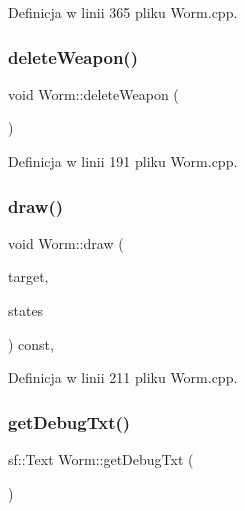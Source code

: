 Definicja w linii 365 pliku Worm.\+cpp.

\mbox{\label{class_worm_adbede9b2b03f764f71629a299aec5299}} 
\subsubsection{\texorpdfstring{delete\+Weapon()}{deleteWeapon()}}
{\footnotesize\ttfamily void Worm\+::delete\+Weapon (\begin{DoxyParamCaption}{ }\end{DoxyParamCaption})}



Definicja w linii 191 pliku Worm.\+cpp.

\mbox{\label{class_worm_adc9fd6dc3b770d4feada327666f31ee3}} 
\subsubsection{\texorpdfstring{draw()}{draw()}}
{\footnotesize\ttfamily void Worm\+::draw (\begin{DoxyParamCaption}\item[{sf\+::\+Render\+Target \&}]{target,  }\item[{sf\+::\+Render\+States}]{states }\end{DoxyParamCaption}) const\hspace{0.3cm}{\ttfamily [override]}, {\ttfamily [protected]}}



Definicja w linii 211 pliku Worm.\+cpp.

\mbox{\label{class_worm_afed2a8beb878659d49977440293ef884}} 
\subsubsection{\texorpdfstring{get\+Debug\+Txt()}{getDebugTxt()}}
{\footnotesize\ttfamily sf\+::\+Text Worm\+::get\+Debug\+Txt (\begin{DoxyParamCaption}{ }\end{DoxyParamCaption})}



